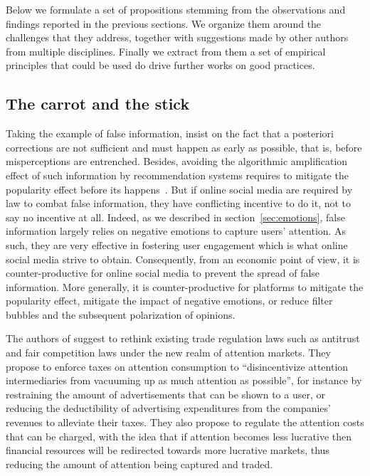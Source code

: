 \documentclass[10pt]{article}
\begin{document}
Below we formulate a set of propositions stemming from the observations and findings reported in the previous sections. We organize them  around the challenges that they address, together with suggestions made by other authors from multiple disciplines. Finally we extract from them a set of empirical principles that could be used do drive further works on good practices.


\subsection{The carrot and the stick}

Taking the example of false information, \cite{vraga2020correction} insist on the fact that a posteriori corrections are not sufficient and must happen as early as possible, that is, before misperceptions are entrenched.
Besides, avoiding the algorithmic amplification effect of such information by recommendation systems requires to mitigate the popularity effect before its happens~\cite{fernandez_analysing_2021}.
But if online social media are required by law to combat false information, they have conflicting incentive to do it, not to say no incentive at all. 
Indeed, as we described in section~\ref{sec:emotions}, false information largely relies on negative emotions to capture users' attention. As such, they are very effective in fostering user engagement which is what online social media strive to obtain.
Consequently, from an economic point of view, it is counter-productive for online social media to prevent the spread of false information.
More generally, it is counter-productive for platforms to mitigate the popularity effect, mitigate the impact of negative emotions, or reduce filter bubbles and the subsequent polarization of opinions.

The authors of \cite{newman_regulating_2019} suggest to rethink existing trade regulation laws such as antitrust and fair competition laws under the new realm of attention markets. 
They propose to enforce taxes on attention consumption to ``disincentivize attention intermediaries from vacuuming up as much attention as possible'', for instance by restraining the amount of advertisements that can be shown to a user, or reducing the deductibility of advertising expenditures from the companies' revenues to alleviate their taxes.
They also propose to regulate the attention costs that can be charged, with the idea that if attention becomes less lucrative then financial resources will be redirected towards more lucrative markets, thus reducing the amount of attention being captured and traded.
\end{document}
